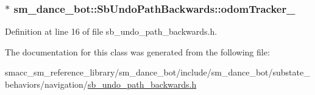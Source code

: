 \subsubsection[{\texorpdfstring{odom\+Tracker\+\_\+}{odomTracker_}}]{$\ast$ sm\+\_\+dance\+\_\+bot\+::\+Sb\+Undo\+Path\+Backwards\+::odom\+Tracker\+\_\+\hspace{0.3cm}{\ttfamily [private]}}\hypertarget{classsm__dance__bot_1_1SbUndoPathBackwards_aa35572a97ab8c00aac3d34c95c43e6bb}{}\label{classsm__dance__bot_1_1SbUndoPathBackwards_aa35572a97ab8c00aac3d34c95c43e6bb}


Definition at line 16 of file sb\+\_\+undo\+\_\+path\+\_\+backwards.\+h.



The documentation for this class was generated from the following file\+:\begin{DoxyCompactItemize}
\item 
smacc\+\_\+sm\+\_\+reference\+\_\+library/sm\+\_\+dance\+\_\+bot/include/sm\+\_\+dance\+\_\+bot/substate\+\_\+behaviors/navigation/\hyperlink{sb__undo__path__backwards_8h}{sb\+\_\+undo\+\_\+path\+\_\+backwards.\+h}\end{DoxyCompactItemize}
